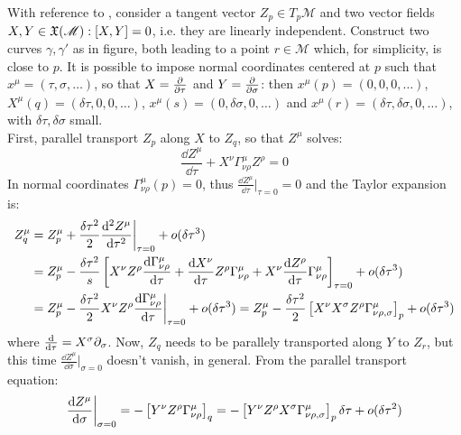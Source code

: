 With reference to , consider a tangent vector $ Z_p \in T_p \mathcal{M} $ and two vector fields $ X,Y \in \mathfrak{X}(\mathscr{M}) : [X,Y] = 0 $, i.e. they are linearly independent. Construct two curves $ \gamma, \gamma' $ as in figure, both leading to a point $ r \in \mathcal{M} $ which, for simplicity, is close to $ p $. It is possible to impose normal coordinates centered at $ p $ such that $ x^\mu = (\tau, \sigma, \dots) $, so that $ X = \frac{\partial}{\partial \tau} $ and $ Y = \frac{\partial}{\partial \sigma} $: then $ x^\mu(p) = (0,0,0, \dots) $, $ X^\mu(q) = (\delta \tau, 0, 0, \dots) $, $ x^\mu(s) = (0, \delta \sigma, 0, \dots) $ and $ x^\mu(r) = (\delta \tau, \delta \sigma, 0, \dots)$, with $ \delta \tau, \delta \sigma $ small.\\
First, parallel transport $ Z_p $ along $ X $ to $ Z_q $, so that $ Z^\mu $ solves:
\begin{equation*}
  \frac{\dd Z^\mu}{\dd \tau} + X^\nu \Gamma^\mu_{\nu \rho} Z^\rho = 0
\end{equation*}
In normal coordinates $ \Gamma^\mu_{\nu \rho}(p) = 0 $, thus $ \frac{\dd Z^\mu}{\dd \tau}\big\vert_{\tau = 0} = 0 $ and the Taylor expansion is:
\begin{equation*}
  \begin{split}
    Z_q^\mu
    &= Z_p^\mu + \frac{\delta \tau^2}{2} \frac{\mathrm{d}^2 Z^\mu}{\mathrm{d} \tau^2}\bigg\vert_{\tau = 0} + o(\delta\tau^3) \\
    &= Z_p^\mu - \frac{\delta\tau^2}{s} \left[ X^\nu Z^\rho \frac{\mathrm{d} \Gamma^\mu_{\nu \rho}}{\mathrm{d} \tau} + \frac{\mathrm{d} X^\nu}{\mathrm{d} \tau} Z^\rho \Gamma^\mu_{\nu \rho} + X^\nu \frac{\mathrm{d} Z^\rho}{\mathrm{d} \tau} \Gamma^\mu_{\nu \rho} \right]_{\tau = 0} + o(\delta\tau^3) \\
    &= Z_p^\mu - \frac{\delta\tau^2}{2} X^\nu Z^\rho \frac{\mathrm{d} \Gamma^\mu_{\nu \rho}}{\mathrm{d} \tau}\bigg\vert_{\tau = 0} + o(\delta\tau^3) = Z_p^\mu - \frac{\delta\tau^2}{2} \left[ X^\nu X^\sigma Z^\rho \Gamma^\mu_{\nu \rho , \sigma} \right]_p + o(\delta\tau^3)
  \end{split}
\end{equation*}
where $ \frac{\mathrm{d}}{\mathrm{d} \tau} = X^\sigma \partial_\sigma $. Now, $ Z_q $ needs to be parallely transported along $ Y $ to $ Z_r $, but this time $ \frac{\dd Z^\mu}{\dd \sigma}\big\vert_{\sigma = 0} $ doesn't vanish, in general. From the parallel transport equation:
\begin{equation*}
  \frac{\mathrm{d} Z^\mu}{\mathrm{d} \sigma}\bigg\vert_{\sigma = 0} = - \left[ Y^\nu Z^\rho \Gamma^\mu_{\nu \rho} \right]_q = - \left[ Y^\nu Z^\rho X^\sigma \Gamma^\mu_{\nu \rho , \sigma} \right]_p \delta \tau + o(\delta\tau^2)
\end{equation*}
